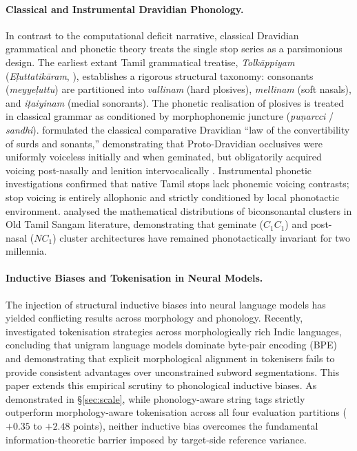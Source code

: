 \documentclass[11pt]{article}
\begin{document}
\paragraph{Classical and Instrumental Dravidian Phonology.}
In contrast to the computational deficit narrative, classical Dravidian grammatical and phonetic theory treats the single stop series as a parsimonious design. The earliest extant Tamil grammatical treatise, \textit{Tolk\={a}ppiyam} (\textit{E\d{l}uttatik\={a}ram}, \citealt{niklas1988tamil}), establishes a rigorous structural taxonomy: consonants (\textit{meyye\d{l}uttu}) are partitioned into \textit{vallinam} (hard plosives), \textit{mellinam} (soft nasals), and \textit{i\d{t}aiyinam} (medial sonorants). The phonetic realisation of plosives is treated in classical grammar as conditioned by morphophonemic juncture (\textit{pu\d{n}arcci} / \textit{sandhi}). \citet{caldwell1875comparative} formulated the classical comparative Dravidian ``law of the convertibility of surds and sonants,'' demonstrating that Proto-Dravidian occlusives were uniformly voiceless initially and when geminated, but obligatorily acquired voicing post-nasally and lenition intervocalically \cite{zvelebil1970dravidian}. Instrumental phonetic investigations \cite{lisker1958tamil,christdas1988phonology,keane2004dravidian} confirmed that native Tamil stops lack phonemic voicing contrasts; stop voicing is entirely allophonic and strictly conditioned by local phonotactic environment. \citet{lakshmanan2025biconsonantal} analysed the mathematical distributions of biconsonantal clusters in Old Tamil Sangam literature, demonstrating that geminate ($C_1C_1$) and post-nasal ($NC_1$) cluster architectures have remained phonotactically invariant for two millennia.

\paragraph{Inductive Biases and Tokenisation in Neural Models.}
The injection of structural inductive biases into neural language models has yielded conflicting results across morphology and phonology. Recently, \citet{vemula-etal-2025-rethinking} investigated tokenisation strategies across morphologically rich Indic languages, concluding that unigram language models dominate byte-pair encoding (BPE) and demonstrating that explicit morphological alignment in tokenisers fails to provide consistent advantages over unconstrained subword segmentations. This paper extends this empirical scrutiny to phonological inductive biases. As demonstrated in \S\ref{sec:scale}, while phonology-aware string tags strictly outperform morphology-aware tokenisation across all four evaluation partitions ($+0.35$ to $+2.48$ points), neither inductive bias overcomes the fundamental information-theoretic barrier imposed by target-side reference variance.
\end{document}
